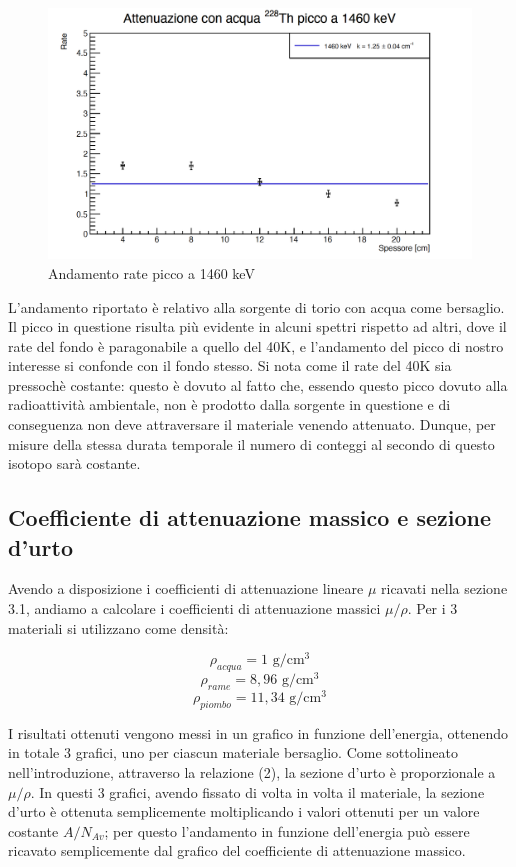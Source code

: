 \documentclass[a4paper,10pt]{article}
\newcommand*{\unit}[1]{\ensuremath{\mathrm{\,#1}}}
\begin{document}
\begin{figure}[H]
    \centering
    \includegraphics[scale=0.6]{grafici/1460keV}
    \caption{Andamento rate picco a 1460 keV}
\end{figure}

\noindent L'andamento riportato \`e relativo alla sorgente di torio con acqua come bersaglio. Il picco in questione risulta pi\`u evidente in alcuni spettri rispetto ad altri, dove il rate del fondo \`e paragonabile a quello del 40K, e l'andamento del picco di nostro interesse si confonde con il fondo stesso. Si nota come il rate del 40K sia pressoch\`e costante: questo \`e dovuto al fatto che, essendo questo picco dovuto alla radioattivit\`a ambientale, non è prodotto dalla sorgente in questione e di conseguenza non deve attraversare il materiale venendo attenuato. Dunque, per misure della stessa durata temporale il numero di conteggi al secondo di questo isotopo sarà costante.

\subsection{Coefficiente di attenuazione massico e sezione d'urto}
Avendo a disposizione i coefficienti di attenuazione lineare $\mu$ ricavati nella sezione 3.1, andiamo a calcolare i coefficienti di attenuazione massici $\mu/\rho$. Per i 3 materiali si utilizzano come densit\`a:

$$
	\rho_{acqua} = 1\, \unit{g/cm^3}
$$
$$
	\rho_{rame} = 8,96\, \unit{g/cm^3}
$$
$$
	\rho_{piombo} = 11,34\, \unit{g/cm^3}
$$

\noindent I risultati ottenuti vengono messi in un grafico in funzione dell'energia, ottenendo in totale 3 grafici, uno per ciascun materiale bersaglio. Come sottolineato nell'introduzione, attraverso la relazione (2), la sezione d'urto \`e proporzionale a $\mu/\rho$. In questi 3 grafici, avendo fissato di volta in volta il materiale, la sezione d'urto \`e ottenuta semplicemente moltiplicando i valori ottenuti per un valore costante $A/N_{Av}$; per questo l'andamento in funzione dell'energia pu\`o essere ricavato semplicemente dal grafico del coefficiente di attenuazione massico.
\end{document}
